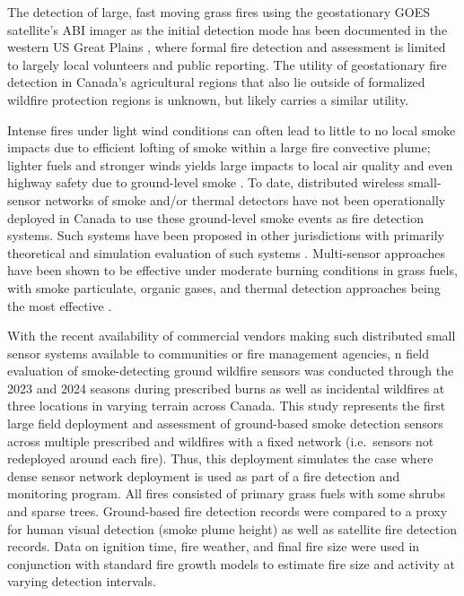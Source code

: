 \documentclass[fire,article,submit,moreauthors]{mdpi}
\begin{document}
The detection of large, fast moving grass fires using the geostationary
GOES satellite's ABI imager as the initial detection mode has been
documented in the western US Great Plains
\citep{lindley2016, lindley2024}, where formal fire detection and
assessment is limited to largely local volunteers and public reporting.
The utility of geostationary fire detection in Canada's agricultural
regions that also lie outside of formalized wildfire protection regions
is unknown, but likely carries a similar utility.

Intense fires under light wind conditions can often lead to little to no
local smoke impacts due to efficient lofting of smoke within a large
fire convective plume; lighter fuels and stronger winds yields large
impacts to local air quality and even highway safety due to ground-level
smoke \citep{brambilla2025}. To date, distributed wireless small-sensor
networks of smoke and/or thermal detectors have not been operationally
deployed in Canada to use these ground-level smoke events as fire
detection systems. Such systems have been proposed in other
jurisdictions \citep[e.g.][]{sonDesignImplementationForestFires2006}
with primarily theoretical and simulation evaluation of such systems
\citep[e.g.][]{sernaDistributedForestFire2015}. Multi-sensor approaches
have been shown to be effective under moderate burning conditions in
grass fuels, with smoke particulate, organic gases, and thermal
detection approaches being the most effective \citep{chwalek2023}.

With the recent availability of commercial vendors making such
distributed small sensor systems available to communities or fire
management agencies, n field evaluation of smoke-detecting ground
wildfire sensors was conducted through the 2023 and 2024 seasons during
prescribed burns as well as incidental wildfires at three locations in
varying terrain across Canada. This study represents the first large
field deployment and assessment of ground-based smoke detection sensors
across multiple prescribed and wildfires with a fixed network
(i.e.~sensors not redeployed around each fire). Thus, this deployment
simulates the case where dense sensor network deployment is used as part
of a fire detection and monitoring program. All fires consisted of
primary grass fuels with some shrubs and sparse trees. Ground-based fire
detection records were compared to a proxy for human visual detection
(smoke plume height) as well as satellite fire detection records. Data
on ignition time, fire weather, and final fire size were used in
conjunction with standard fire growth models to estimate fire size and
activity at varying detection intervals.
\end{document}
